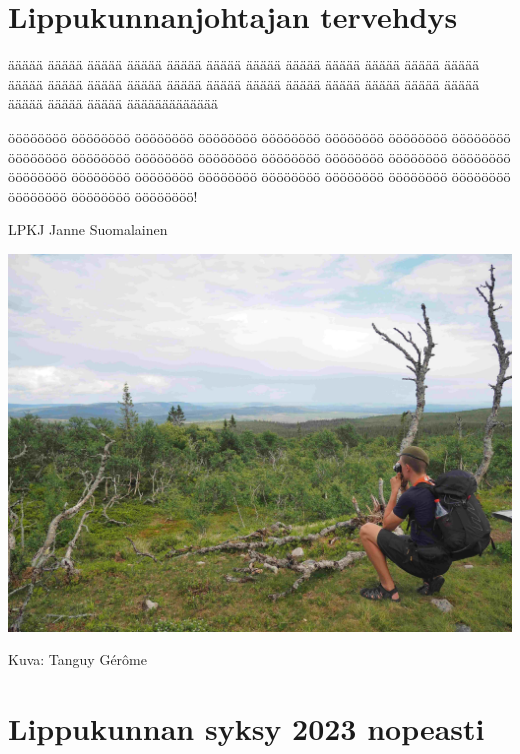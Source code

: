 \documentclass[10pt,finnish,a5paper,headings=small,twoside=semi]{scrartcl}
\begin{document}
\clearpage\tableofcontents

\clearpage\section{Lippukunnanjohtajan tervehdys}


\begin{multicols}{2}


\noindent äääää äääää äääää äääää äääää äääää äääää äääää äääää äääää äääää äääää äääää äääää äääää äääää äääää äääää äääää äääää äääää äääää äääää äääää äääää äääää äääää äääääääääääää

öööööööö öööööööö öööööööö öööööööö öööööööö öööööööö öööööööö öööööööö öööööööö öööööööö öööööööö öööööööö öööööööö öööööööö öööööööö öööööööö öööööööö öööööööö öööööööö öööööööö öööööööö öööööööö öööööööö öööööööö öööööööö öööööööö öööööööö! \\

\vspace*{0.50cm}

\null\hfill LPKJ Janne Suomalainen

\end{multicols}


\medskip
\noindent\includegraphics[width=\linewidth]{assets/lpkjtervehdys}

\medskip
\noindent\null\hfill Kuva: Tanguy Gérôme

\clearpage\section{Lippukunnan syksy 2023 nopeasti}
\end{document}
